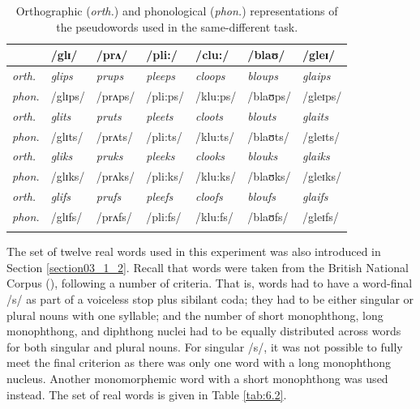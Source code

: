 \begin{table}\fontsize{10}{11}
\caption{Orthographic (\textit{orth.}) and phonological (\textit{phon.}) representations of the pseudowords used in the same-different task.}
\label{tab:6.1}
\centering
\begin{tabular}{lllllll} 
\lsptoprule
~              & /glɪ/          & /prʌ/          & /pli:/          & /clu:/          & /blaʊ/          & /gleɪ/           \\ 
\midrule
\textit{orth.} & \textit{glips} & \textit{prups} & \textit{pleeps} & \textit{cloops} & \textit{bloups} & \textit{glaips}  \\
\textit{phon.} & /glɪps/        & /prʌps/        & /pli:ps/        & /klu:ps/        & /blaʊps/        & /gleɪps/         \\ 
\midrule
\textit{orth.} & \textit{glits} & \textit{pruts} & \textit{pleets} & \textit{cloots} & \textit{blouts} & \textit{glaits}  \\
\textit{phon.} & /glɪts/        & /prʌts/        & /pli:ts/        & /klu:ts/        & /blaʊts/        & /gleɪts/         \\ 
\midrule
\textit{orth.} & \textit{gliks} & \textit{pruks} & \textit{pleeks} & \textit{clooks} & \textit{blouks} & \textit{glaiks}  \\
\textit{phon.} & /glɪks/        & /prʌks/        & /pli:ks/        & /klu:ks/        & /blaʊks/        & /gleɪks/         \\ 
\midrule
\textit{orth.} & \textit{glifs} & \textit{prufs} & \textit{pleefs} & \textit{cloofs} & \textit{bloufs} & \textit{glaifs}  \\
\textit{phon.} & /glɪfs/        & /prʌfs/        & /pli:fs/        & /klu:fs/        & /blaʊfs/        & /gleɪfs/         \\
\lspbottomrule
\end{tabular}
\end{table}

The set of twelve real words used in this experiment was also introduced in Section \ref{section03_1_2}. Recall that words were taken from the British National Corpus (\cite{Davies2004}), following a number of criteria. That is, words had to have a word-final /s/ as part of a voiceless stop plus sibilant coda; they had to be either singular or plural nouns with one syllable; and the number of short monophthong, long monophthong, and diphthong nuclei had to be equally distributed across words for both singular and plural nouns. For singular /s/, it was not possible to fully meet the final criterion as there was only one word with a long monophthong nucleus. Another monomorphemic word with a short monophthong was used instead. The set of real words is given in Table \ref{tab:6.2}.

